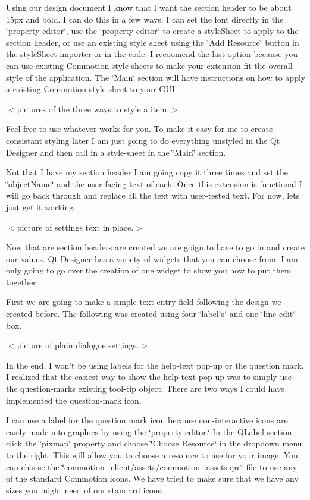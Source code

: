 Using our design document I know that I want the section header to be about 15px and bold. I can do this in a few ways. I can set the font directly in the \char`\"{}property editor\char`\"{}, use the \char`\"{}property editor\char`\"{} to create a style\+Sheet to apply to the section header, or use an existing style sheet using the \char`\"{}\+Add Resource\char`\"{} button in the style\+Sheet importer or in the code. I recoomend the last option because you can use existing Commotion style sheets to make your extension fit the overall style of the application. The \char`\"{}\+Main\char`\"{} section will have instructions on how to apply a existing Commotion style sheet to your G\+U\+I.

$<$pictures of the three ways to style a item.$>$

Feel free to use whatever works for you. To make it easy for me to create consistant styling later I am just going to do everything unstyled in the Qt Designer and then call in a style-\/sheet in the \char`\"{}\+Main\char`\"{} section.

Not that I have my section header I am going copy it three times and set the \char`\"{}object\+Name\char`\"{} and the user-\/facing text of each. Once this extension is functional I will go back through and replace all the text with user-\/tested text. For now, lets just get it working.

$<$picture of settings text in place.$>$

Now that are section headers are created we are goign to have to go in and create our values. Qt Designer has a variety of widgets that you can choose from. I am only going to go over the creation of one widget to show you how to put them together.

First we are going to make a simple text-\/entry field following the design we created before. The following was created using four \char`\"{}label's\char`\"{} and one \char`\"{}line edit\char`\"{} box.

$<$picture of plain dialogue settings.$>$

In the end, I won't be using labels for the help-\/text pop-\/up or the question mark. I realized that the easiest way to show the help-\/text pop up was to simply use the question-\/marks existing tool-\/tip object. There are two ways I could have implemented the question-\/mark icon.

I can use a label for the question mark icon because non-\/interactive icons are easily made into graphics by using the \char`\"{}property editor.\char`\"{} In the Q\+Label section click the \char`\"{}pixmap\char`\"{} property and choose \char`\"{}\+Choose Resource\char`\"{} in the dropdown menu to the right. This will allow you to choose a resource to use for your image. You can choose the \char`\"{}commotion\+\_\+client/assets/commotion\+\_\+assets.\+qrc\char`\"{} file to use any of the standard Commotion icons. We have tried to make sure that we have any sizes you might need of our standard icons.

